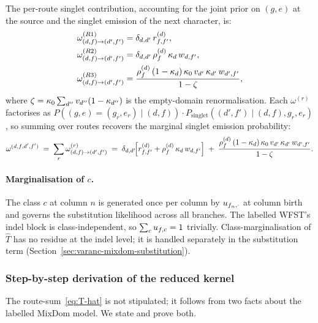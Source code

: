 The per-route singlet contribution, accounting for the joint prior
on $(g, e)$ at the source and the singlet emission of the next
character, is:
\begin{align}
\label{eq:omega-routes}
\omega^{(R1)}_{(d, f) \to (d', f')}
&= \delta_{d, d'}\,r^{(d)}_{f, f'}, \\
\omega^{(R2)}_{(d, f) \to (d', f')}
&= \delta_{d, d'}\,\rho^{(d)}_f\,\kappa_d\,w_{d, f'}, \\
\omega^{(R3)}_{(d, f) \to (d', f')}
&= \frac{\rho^{(d)}_f\,(1-\kappa_d)\,\kappa_0\,v_{d'}\,\kappa_{d'}\,w_{d', f'}}{1-\zeta},
\end{align}
where $\zeta = \kappa_0 \sum_{d''} v_{d''}(1-\kappa_{d''})$
is the empty-domain renormalisation. Each $\omega^{(r)}$
factorises as $P((g, e) = (g_r, e_r) \mid (d, f)) \cdot
P_{\text{singlet}}((d', f') \mid (d, f), g_r, e_r)$, so summing
over routes recovers the marginal singlet emission probability:
\begin{equation}
\label{eq:omega}
\omega^{(d, f, d', f')}
\;=\; \sum_r \omega^{(r)}_{(d, f) \to (d', f')}
\;=\; \delta_{d, d'}\!\Big[r^{(d)}_{f, f'}
                          + \rho^{(d)}_f\,\kappa_d\,w_{d, f'}\Big]
\;+\; \frac{\rho^{(d)}_f\,(1-\kappa_d)\,\kappa_0\,v_{d'}\,\kappa_{d'}\,w_{d', f'}}{1-\zeta}.
\end{equation}

\paragraph{Marginalisation of $c$.}
The class $c$ at column $n$ is generated once per column by
$u_{f_n, \cdot}$ at column birth and governs the
substitution likelihood across all branches. The labelled WFST's
indel block is class-independent, so $\sum_c u_{f, c} = 1$
trivially. Class-marginalisation of $\hat{T}$ has no residue at the
indel level; it is handled separately in the substitution term
(Section~\ref{sec:varanc-mixdom-substitution}).

\subsubsection{Step-by-step derivation of the reduced kernel}
\label{sec:varanc-mixdom-derivation}

The route-sum~\eqref{eq:T-hat} is not stipulated; it follows from
two facts about the labelled MixDom model. We state and prove
both.

